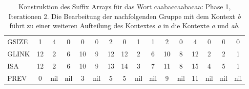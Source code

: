 \begin{table}[H]
\begin{adjustbox}{max width=\textwidth}
\begin{tabular}{lccccccccccccccc}
\multicolumn{1}{l|}{GSIZE}   & \multicolumn{1}{c|}{1}  & \cellcolor[HTML]{\red}4 & 0                         & 0                         & \multicolumn{1}{c|}{0}  & \cellcolor[HTML]{\red}2 & \multicolumn{1}{c|}{\cellcolor[HTML]{\red}0} & \multicolumn{1}{c|}{1}    & \multicolumn{1}{c|}{1}    & 2                          & \multicolumn{1}{c|}{0}     & 4  & 0                         & 0                         & 0   \\
\multicolumn{1}{l|}{GLINK}   & 12                      & 2                         & \cellcolor[HTML]{\red}6 & 10                        & 9                       & 12                        & 12                                             & 2                         & \cellcolor[HTML]{\red}6 & 10                         & 8                          & 12 & 2                         & 2                         & 1   \\
\multicolumn{1}{l|}{ISA}     & 12                      & 2                         & \cellcolor[HTML]{\red}6 & 10                        & 9                       & 13                        & 14                                             & \cellcolor[HTML]{\red}3 & \cellcolor[HTML]{\red}7 & 11                         & 8                          & 15 & \cellcolor[HTML]{\red}4 & \cellcolor[HTML]{\red}5 & 1   \\
\multicolumn{1}{l|}{PREV}    & 0                       & nil                       & nil                       & \cellcolor[HTML]{\red}3 & nil                     & 5                         & 5                                              & nil                       & nil                       & \cellcolor[HTML]{\red}9  & nil                        & 11 & nil                       & nil                       & nil
\end{tabular}
\end{adjustbox}

\caption[Konstruktion des Suffix Arrays für das Wort caabaccaabacaa: Phase 1, Iterationen 2]{Konstruktion des Suffix Arrays für das Wort caabaccaabacaa: Phase 1, Iterationen 2. Die Bearbeitung der nachfolgenden Gruppe mit dem Kontext \textit{b} führt zu einer weiteren Aufteilung des Kontextes \textit{a} in die Kontexte \textit{a} und \textit{ab}.}
\label{table_complex_example_1_2} 
\end{table}

